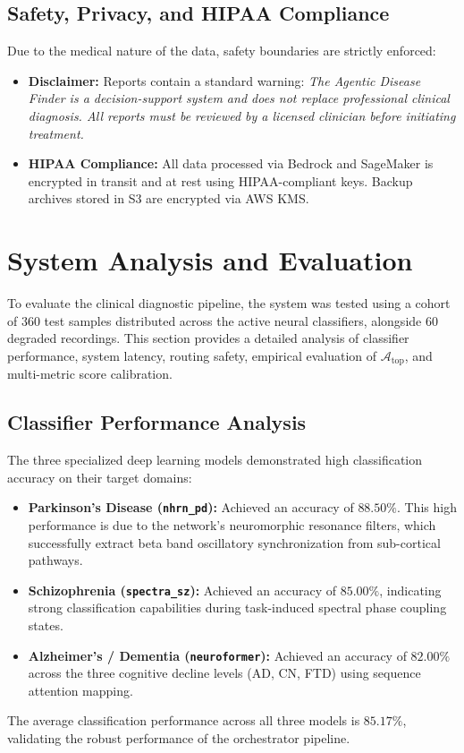 \documentclass[runningheads]{llncs}
\begin{document}
\subsection{Safety, Privacy, and HIPAA Compliance}
Due to the medical nature of the data, safety boundaries are strictly enforced:
\begin{itemize}
    \item \textbf{Disclaimer:} Reports contain a standard warning: \textit{The Agentic Disease Finder is a decision-support system and does not replace professional clinical diagnosis. All reports must be reviewed by a licensed clinician before initiating treatment.}
    \item \textbf{HIPAA Compliance:} All data processed via Bedrock and SageMaker is encrypted in transit and at rest using HIPAA-compliant keys. Backup archives stored in S3 are encrypted via AWS KMS.
\end{itemize}

\section{System Analysis and Evaluation}
To evaluate the clinical diagnostic pipeline, the system was tested using a cohort of $360$ test samples distributed across the active neural classifiers, alongside 60 degraded recordings. This section provides a detailed analysis of classifier performance, system latency, routing safety, empirical evaluation of $\mathcal{A}_{\text{top}}$, and multi-metric score calibration.

\subsection{Classifier Performance Analysis}
The three specialized deep learning models demonstrated high classification accuracy on their target domains:
\begin{itemize}
    \item \textbf{Parkinson's Disease (\texttt{nhrn\_pd}):} Achieved an accuracy of $88.50\%$. This high performance is due to the network's neuromorphic resonance filters, which successfully extract beta band oscillatory synchronization from sub-cortical pathways.
    \item \textbf{Schizophrenia (\texttt{spectra\_sz}):} Achieved an accuracy of $85.00\%$, indicating strong classification capabilities during task-induced spectral phase coupling states.
    \item \textbf{Alzheimer's / Dementia (\texttt{neuroformer}):} Achieved an accuracy of $82.00\%$ across the three cognitive decline levels (AD, CN, FTD) using sequence attention mapping.
\end{itemize}
The average classification performance across all three models is $85.17\%$, validating the robust performance of the orchestrator pipeline.
\end{document}
